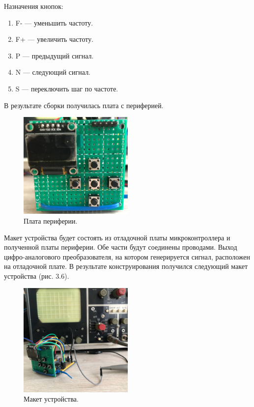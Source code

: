 	Назначения кнопок:
	\begin{enumerate}
	\item F- --- уменьшить частоту.
	\item F+ --- увеличить частоту.
	\item P --- предыдущий сигнал.
	\item N --- следующий сигнал.
	\item S --- переключить шаг по частоте.
	\end{enumerate}
	
	В результате сборки получилась плата с периферией.

	\begin{figure}[H]
    \centering
    \includegraphics[width=0.5\textwidth]{../image/m1.jpeg}
    \caption{Плата периферии.}
	\end{figure}	
	
	Макет устройства будет состоять из отладочной платы микроконтроллера и полученной платы периферии. Обе части будут соединены проводами. Выход цифро-аналогового преобразователя, на котором генерируется сигнал, расположен на отладочной плате. В результате конструирования получился следующий макет устройства (рис. 3.6).

	\begin{figure}[H]
    \centering
    \includegraphics[width=0.5\textwidth]{../image/m2.jpg}
    \caption{Макет устройства.}
	\end{figure}	

